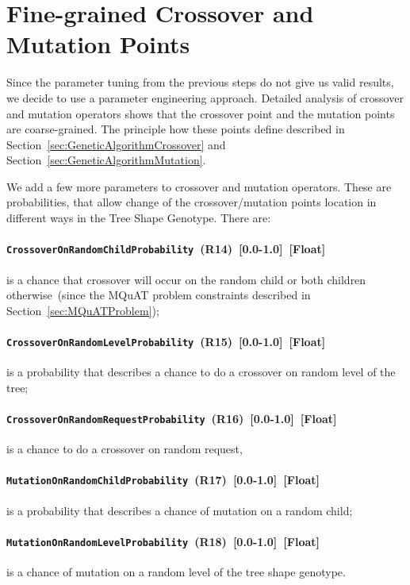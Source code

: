\section{Fine-grained Crossover and Mutation Points}\label{sec:NP}

Since the parameter tuning from the previous steps do not give us valid results, we decide to use a parameter engineering approach.
Detailed analysis of crossover and mutation operators shows that the crossover point and the mutation points are coarse-grained. The principle how these points define described in Section~\ref{sec:GeneticAlgorithmCrossover} and Section~\ref{sec:GeneticAlgorithmMutation}.

We add a few more parameters to crossover and mutation operators. These are probabilities, that allow change of the crossover/mutation points location in different ways in the Tree Shape Genotype.
There are:
\paragraph{\texttt{CrossoverOnRandomChildProbability}~(R14)~[0.0-1.0]~[Float]} is a chance that crossover will occur on the random child or both children otherwise~(since the MQuAT problem constraints described in Section~\ref{sec:MQuATProblem});
\paragraph{\texttt{CrossoverOnRandomLevelProbability}~(R15)~[0.0-1.0]~[Float]} is a probability that describes a chance to do a crossover on random level of the tree;
\paragraph{\texttt{CrossoverOnRandomRequestProbability}~(R16)~[0.0-1.0]~[Float]} is a chance to do a crossover on random request,
\paragraph{\texttt{MutationOnRandomChildProbability}~(R17)~[0.0-1.0]~[Float]} is a probability that describes a chance of mutation on a random child;
\paragraph{\texttt{MutationOnRandomLevelProbability}~(R18)~[0.0-1.0]~[Float]} is a chance of mutation on a random level of the tree shape genotype.

